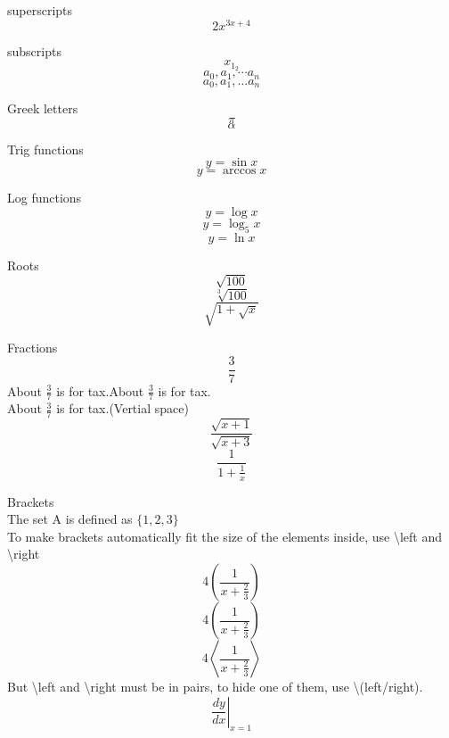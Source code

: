 \documentclass[11pt]{article}
\begin{document}
superscripts
$$2x^{3x+4}$$

subscripts
$$x_{1_2}$$
$$a_0, a_1,\cdots a_n$$
$$a_0, a_1,\ldots a_n$$

Greek letters
$$\pi$$
$$\alpha$$

Trig functions
$$y=\sin x$$
$$y=\arccos x$$

Log functions
$$y=\log x$$
$$y=\log_{5} x$$
$$y=\ln x$$

Roots
$$\sqrt{100}$$
$$\sqrt[3]{100}$$
$$\sqrt{   1+\sqrt{x}   }$$

Fractions
$$\frac{3}{7}$$
About $\displaystyle \frac{3}{7}$ is for tax.About $\frac{3}{7}$ is for tax.\\[6pt]
About $\frac{3}{7}$ is for tax.(Vertial space)
$$\frac{\sqrt{x+1}}{\sqrt{x+3}}$$
$$\frac{1}{   1+\frac{1}{x}   }$$

Brackets\\
The set A is defined as $\{1, 2, 3\}$\\
To make brackets automatically fit the size of the elements inside, use \textbackslash left and \textbackslash right
$$4(\frac{1}{x+\frac{2}{3}})$$
$$4\left(\frac{1}{x+\frac{2}{3}}\right)$$
$$4\left\langle\frac{1}{x+\frac{2}{3}}\right\rangle$$
But \textbackslash left and \textbackslash right must be in pairs, to hide one of them, use \textbackslash (left/right).
$$\left.\frac{dy}{dx}\right|_{x=1}$$
\end{document}
